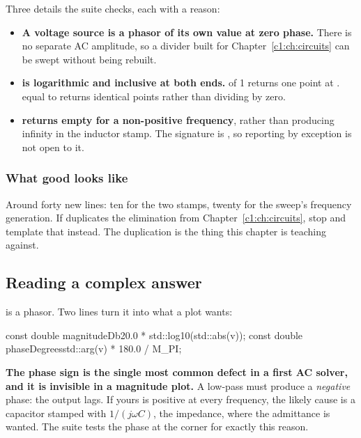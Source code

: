 Three details the suite checks, each with a reason:

\begin{itemize}
  \item \textbf{A voltage source is a phasor of its own value at zero phase.} There is no separate AC amplitude, so a divider built for Chapter~\ref{c1:ch:circuits} can be swept without being rebuilt.
  \item \textbf{ is logarithmic and inclusive at both ends.}  of 1 returns one point at .  equal to  returns  identical points rather than dividing by zero.
  \item \textbf{ returns empty for a non-positive frequency}, rather than producing infinity in the inductor stamp. The signature is , so reporting by exception is not open to it.
\end{itemize}

\subsubsection{What good looks like}
Around forty new lines: ten for the two stamps, twenty for the sweep's frequency generation. If  duplicates the elimination from Chapter~\ref{c1:ch:circuits}, stop and template that instead. The duplication is the thing this chapter is teaching against.

\subsection{Reading a complex answer}
\label{c2:sec:b5}
 is a phasor. Two lines turn it into what a plot wants:

\begin{cppcode}
const double magnitudeDb{20.0 * std::log10(std::abs(v))};
const double phaseDegrees{std::arg(v) * 180.0 / M_PI};
\end{cppcode}

\textbf{The phase sign is the single most common defect in a first AC solver, and it is invisible in a magnitude plot.} A low-pass must produce a \emph{negative} phase: the output lags. If yours is positive at every frequency, the likely cause is a capacitor stamped with $1/(j\omega C)$, the impedance, where the admittance is wanted. The suite tests the phase at the corner for exactly this reason.


